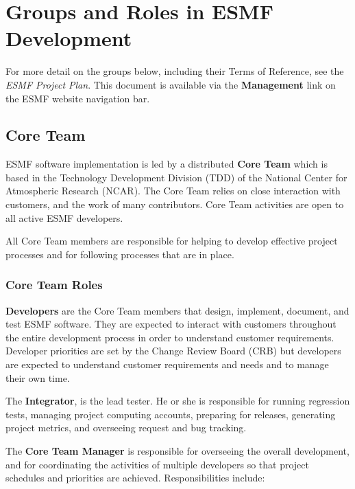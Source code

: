 
\section{Groups and Roles in ESMF Development}

For more detail on the groups below, including their Terms of
Reference, see the {\it ESMF Project Plan}\cite{bib:ESMFprojectplan}.
This document is available via the {\bf Management} link on 
the ESMF website navigation bar.

\subsection{Core Team}
ESMF software implementation is led by a distributed {\bf Core Team} which is based in the 
Technology Development Division (TDD) of the National Center for
Atmospheric Research (NCAR).  The Core Team relies on close interaction
with customers, and the work of many contributors.  Core Team
activities are open to all active ESMF developers.

All Core Team members are responsible for helping to 
develop effective project processes and for following
processes that are in place.

\subsubsection{Core Team Roles}
\label{core}
{\bf Developers} are the Core Team members that design, implement, document, and test
ESMF software.  They are expected to interact with customers throughout the entire
development process in order to understand customer requirements.  Developer priorities are set by the Change Review Board (CRB) but developers are expected to understand customer requirements and
needs and to manage their own time.

The {\bf Integrator}, is the lead tester. He or she is responsible for running regression
tests, managing project computing accounts, preparing for releases,
generating project metrics, and overseeing request and bug tracking.

The {\bf Core Team Manager} is responsible for overseeing the overall development, and 
for coordinating the activities of multiple developers
so that project schedules and priorities are achieved.
Responsibilities include:

